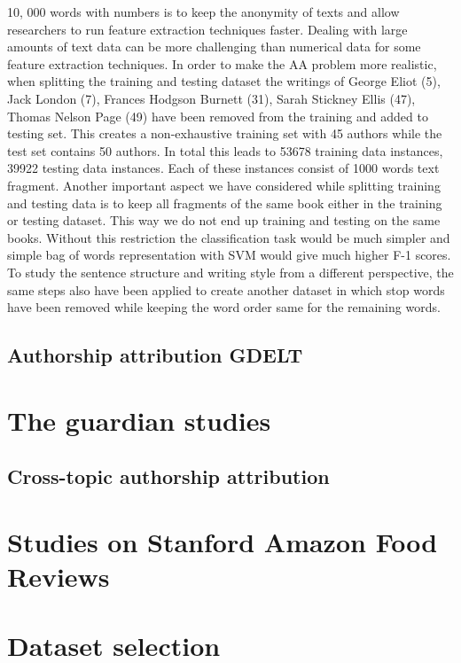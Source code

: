 10, 000 words with numbers is to keep the anonymity of texts and allow researchers
to run feature extraction techniques faster. Dealing with large amounts of text data
can be more challenging than numerical data for some feature extraction techniques.
In order to make the AA problem more realistic, when splitting the training and
testing dataset the writings of George Eliot (5), Jack London (7), Frances Hodgson
Burnett (31), Sarah Stickney Ellis (47), Thomas Nelson Page (49) have been removed
from the training and added to testing set. This creates a non-exhaustive training set
with 45 authors while the test set contains 50 authors. In total this leads to 53678
training data instances, 39922 testing data instances. Each of these instances consist
of 1000 words text fragment. Another important aspect we have considered while
splitting training and testing data is to keep all fragments of the same book either in
the training or testing dataset. This way we do not end up training and testing on the
same books. Without this restriction the classification task would be much simpler
and simple bag of words representation with SVM would give much higher F-1 scores.
To study the sentence structure and writing style from a different perspective, the
same steps also have been applied to create another dataset in which stop words have
been removed while keeping the word order same for the remaining words.
\subsection{Authorship attribution GDELT}

\section{The guardian studies}

\subsection{Cross-topic authorship attribution}

\section{Studies on Stanford Amazon Food Reviews}

\section{Dataset selection}